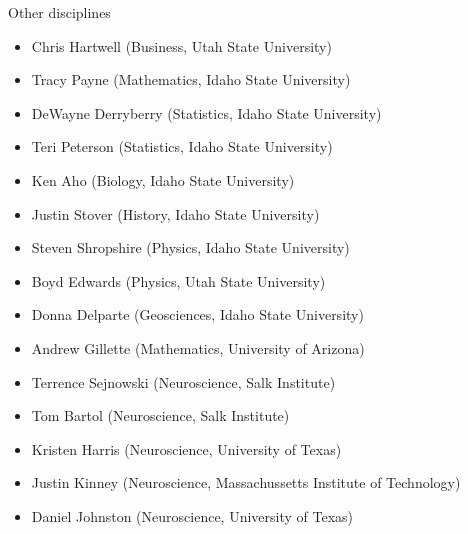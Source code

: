 \documentclass[margin,line]{res}
\begin{document}
\begin{resume}
\begin{LONG}
\vspace{2mm}
Other disciplines
\vspace{2mm}
\begin{itemize}[label={},leftmargin=5mm]
  \setlength\itemsep{0em}
  \item Chris Hartwell (Business, Utah State University)
  \item Tracy Payne (Mathematics, Idaho State University)
  \item DeWayne Derryberry (Statistics, Idaho State University)
  \item Teri Peterson (Statistics, Idaho State University)
  \item Ken Aho (Biology, Idaho State University)
  \item Justin Stover (History, Idaho State University)
  \item Steven Shropshire (Physics, Idaho State University)
  \item Boyd Edwards (Physics, Utah State University)
  \item Donna Delparte (Geosciences, Idaho State University)
  \item Andrew Gillette (Mathematics, University of Arizona)
  \item Terrence Sejnowski (Neuroscience, Salk Institute)
  \item Tom Bartol (Neuroscience, Salk Institute)
  \item Kristen Harris (Neuroscience, University of Texas)
  \item Justin Kinney (Neuroscience, Massachussetts Institute of Technology)
  \item Daniel Johnston (Neuroscience, University of Texas)
\end{itemize}

\end{LONG}

\end{resume}
\end{document}

